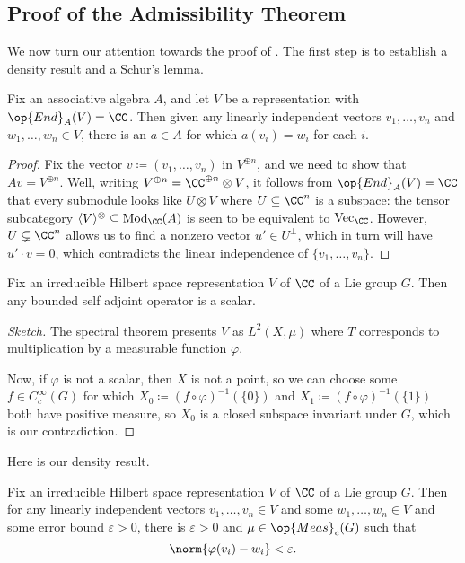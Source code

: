 \documentclass[../notes.tex]{subfiles}
\begin{document}
\subsection{Proof of the Admissibility Theorem}
We now turn our attention towards the proof of . The first step is to establish a density result and a Schur's lemma.
\begin{lemma}
	Fix an associative algebra $A$, and let $V$ be a representation with $\op{End}_A(V)=\CC$. Then given any linearly independent vectors $v_1,\ldots,v_n$ and $w_1,\ldots,w_n\in V$, there is an $a\in A$ for which $a(v_i)=w_i$ for each $i$.
\end{lemma}
\begin{proof}
	Fix the vector $v\coloneqq(v_1,\ldots,v_n)$ in $V^{\oplus n}$, and we need to show that $Av=V^{\oplus n}$. Well, writing $V^{\oplus n}=\CC^{\oplus n}\otimes V$, it follows from $\op{End}_A(V)=\CC$ that every submodule looks like $U\otimes V$ where $U\subseteq\CC^n$ is a subspace: the tensor subcategory $\langle V\rangle^\otimes\subseteq\mathrm{Mod}_\CC(A)$ is seen to be equivalent to $\mathrm{Vec}_\CC$. However, $U\subsetneq\CC^n$ allows us to find a nonzero vector $u'\in U^\perp$, which in turn will have $u'\cdot v=0$, which contradicts the linear independence of $\{v_1,\ldots,v_n\}$.
\end{proof}
\begin{proposition}
	Fix an irreducible Hilbert space representation $V$ of $\CC$ of a Lie group $G$. Then any bounded self adjoint operator is a scalar.
\end{proposition}
\begin{proof}[Sketch]
	The spectral theorem presents $V$ as $L^2(X,\mu)$ where $T$ corresponds to multiplication by a measurable function $\varphi$.

	Now, if $\varphi$ is not a scalar, then $X$ is not a point, so we can choose some $f\in C_c^\infty(G)$ for which $X_0\coloneqq(f\circ\varphi)^{-1}(\{0\})$ and $X_1\coloneqq(f\circ\varphi)^{-1}(\{1\})$ both have positive measure, so $X_0$ is a closed subspace invariant under $G$, which is our contradiction.
\end{proof}
Here is our density result.
\begin{corollary}[Density] \label{cor:density-of-unitary-ops}
	Fix an irreducible Hilbert space representation $V$ of $\CC$ of a Lie group $G$. Then for any linearly independent vectors $v_1,\ldots,v_n\in V$ and some $w_1,\ldots,w_n\in V$ and some error bound $\varepsilon>0$, there is $\varepsilon>0$ and $\mu\in\op{Meas}_c(G)$ such that
	\[\norm{\varphi(v_i)-w_i}<\varepsilon.\]
\end{corollary}
\end{document}
